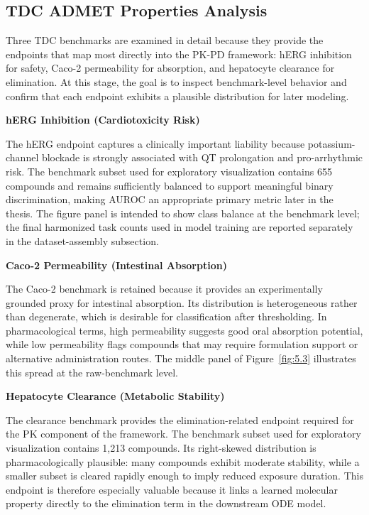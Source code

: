 \documentclass[a4paper,11pt,twoside]{report}
\begin{document}
\subsection{TDC ADMET Properties Analysis}

Three TDC benchmarks are examined in detail because they provide the endpoints that map most directly into the PK-PD framework: hERG inhibition for safety, Caco-2 permeability for absorption, and hepatocyte clearance for elimination. At this stage, the goal is to inspect benchmark-level behavior and confirm that each endpoint exhibits a plausible distribution for later modeling.

\noindent\textbf{hERG Inhibition (Cardiotoxicity Risk)}\par\medskip

The hERG endpoint captures a clinically important liability because potassium-channel blockade is strongly associated with QT prolongation and pro-arrhythmic risk. The benchmark subset used for exploratory visualization contains 655 compounds and remains sufficiently balanced to support meaningful binary discrimination, making AUROC an appropriate primary metric later in the thesis. The figure panel is intended to show class balance at the benchmark level; the final harmonized task counts used in model training are reported separately in the dataset-assembly subsection.

\noindent\textbf{Caco-2 Permeability (Intestinal Absorption)}\par\medskip

The Caco-2 benchmark is retained because it provides an experimentally grounded proxy for intestinal absorption. Its distribution is heterogeneous rather than degenerate, which is desirable for classification after thresholding. In pharmacological terms, high permeability suggests good oral absorption potential, while low permeability flags compounds that may require formulation support or alternative administration routes. The middle panel of Figure~\ref{fig:5.3} illustrates this spread at the raw-benchmark level.

\noindent\textbf{Hepatocyte Clearance (Metabolic Stability)}\par\medskip

The clearance benchmark provides the elimination-related endpoint required for the PK component of the framework. The benchmark subset used for exploratory visualization contains 1,213 compounds. Its right-skewed distribution is pharmacologically plausible: many compounds exhibit moderate stability, while a smaller subset is cleared rapidly enough to imply reduced exposure duration. This endpoint is therefore especially valuable because it links a learned molecular property directly to the elimination term in the downstream ODE model.
\end{document}
